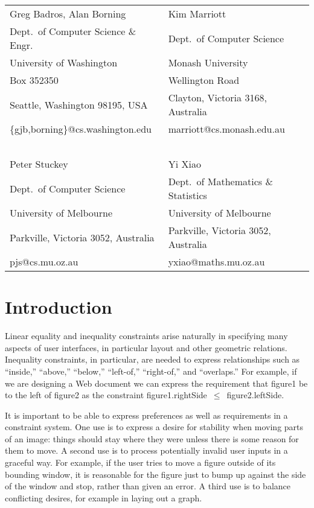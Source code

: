\documentclass{article}
\newcommand{\code}{\small\sf}
\begin{document}
\begin{center}
\begin{tabular}{ll}
Greg Badros, Alan Borning            & Kim Marriott   \\
Dept.\ of Computer Science \& Engr.  & Dept.\ of Computer Science \\
University of Washington             & Monash University \\
Box 352350                           & Wellington Road  \\
Seattle, Washington 98195, USA       & Clayton, Victoria 3168, Australia   \\
\{gjb,borning\}@cs.washington.edu      & marriott@cs.monash.edu.au \\
\ \\
Peter Stuckey                        & Yi Xiao  \\
Dept.\ of Computer Science           & Dept.\ of Mathematics \& Statistics \\
University of Melbourne              & University of Melbourne \\
Parkville, Victoria 3052, Australia  &  Parkville, Victoria 3052, Australia \\
pjs@cs.mu.oz.au                      &  yxiao@maths.mu.oz.au
\end{tabular}
\end{center}

\newpage

\section{Introduction}

Linear equality and inequality constraints arise naturally in specifying
many aspects of user interfaces, in particular layout and other geometric
relations.  Inequality constraints, in particular, are needed to express
relationships such as ``inside,'' ``above,'' ``below,'' ``left-of,''
``right-of,'' and ``overlaps.''  For example, if we are designing a
Web document we can express the
requirement that {\code figure1} be to the left of {\code figure2} as the
constraint \mbox{\code figure1.rightSide $\leq$ figure2.leftSide}.

It is important to be able to express preferences as well as requirements
in a constraint system.  One use is to express a desire for stability
when moving parts of an image: things should stay where they were unless
there is some reason for them to move.  A second use is to process
potentially invalid user inputs in a graceful way.  For example, if the
user tries to move a figure outside of its bounding window, it is
reasonable for the figure just to bump up against the side of the window
and stop, rather than given an error.  A
third use is to balance conflicting desires, for example in laying out a
graph.
\end{document}
